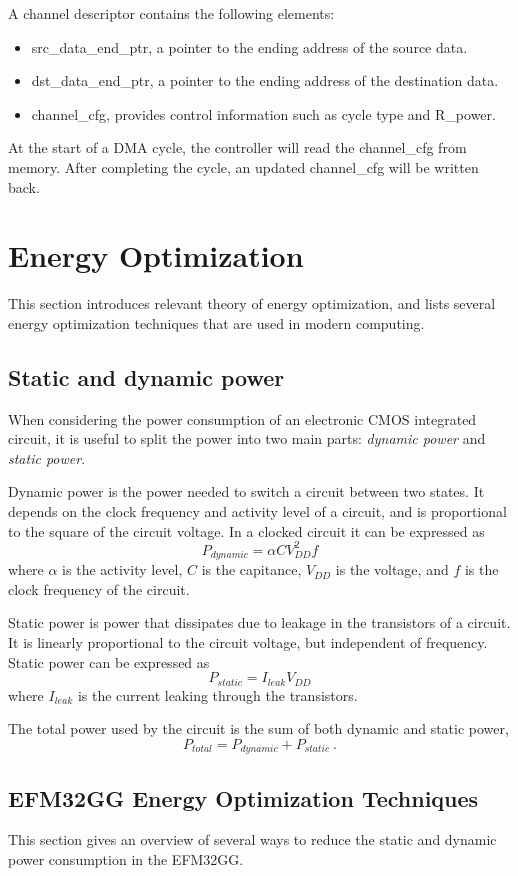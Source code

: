 A channel descriptor contains the following elements:
\begin{itemize}
	\item src\_data\_end\_ptr, a pointer to the ending address of the source data.
	\item dst\_data\_end\_ptr, a pointer to the ending address of the destination data.
	\item channel\_cfg, provides control information such as cycle type and R\_power.
\end{itemize}
At the start of a DMA cycle, the controller will read the channel\_cfg from memory. After completing the cycle, an updated channel\_cfg will be written back.



\section{Energy Optimization}
This section introduces relevant theory of energy optimization, and lists several energy optimization techniques that are used in modern computing.

\subsection{Static and dynamic power}
When considering the power consumption of an electronic CMOS integrated circuit, it is useful to split the power into two main parts: \emph{dynamic power} and \emph{static power}. 

Dynamic power is the power needed to switch a circuit between two states. It depends on the clock frequency and activity level of a circuit, and is proportional to the square of the circuit voltage. In a clocked circuit it can be expressed as
$$P_{dynamic} = \alpha CV_{DD}^{2}f$$
where $\alpha$ is the activity level, $C$ is the capitance, $V_{DD}$ is the voltage, and $f$ is the clock frequency of the circuit.

Static power is power that dissipates due to leakage in the transistors of a circuit. It is linearly proportional to the circuit voltage, but independent of frequency. Static power can be expressed as
$$P_{static} = I_{leak}V_{DD}$$
where $I_{leak}$ is the current leaking through the transistors.

The total power used by the circuit is the sum of both dynamic and static power,
$$P_{total} = P_{dynamic} + P_{static}\ .$$
\cite{cmos-vlsi-design}


\subsection{EFM32GG Energy Optimization Techniques}
This section gives an overview of several ways to reduce the static and dynamic power consumption in the EFM32GG.

